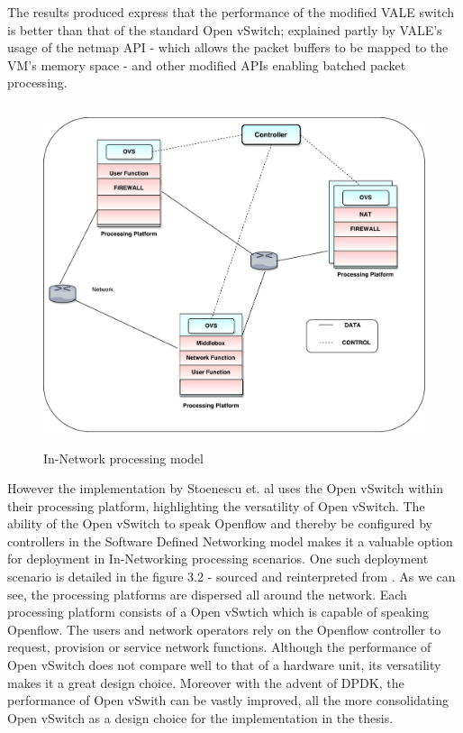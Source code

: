 The results produced express that the performance of the modified VALE switch is better than that of the standard Open vSwitch; explained partly by VALE's usage of the netmap API - which allows the packet buffers to be mapped to the VM's memory space - and other modified APIs enabling batched packet processing.

 \begin{figure}[H]
	\centering
	\caption{In-Network processing model}	
	\includegraphics[height=10cm]{innet01.pdf}	
\end{figure}

However the implementation by Stoenescu et. al \cite{NpForMasses} uses the Open vSwitch within their processing platform, highlighting the versatility of Open vSwitch. The ability of the Open vSwitch to speak Openflow and thereby be configured by controllers in the Software Defined Networking model makes it a valuable option for deployment in In-Networking processing scenarios. One such deployment scenario is detailed in the figure 3.2 - sourced and reinterpreted from \cite{NpForMasses}. As we can see, the processing platforms are dispersed all around the network. Each processing platform consists of a Open vSwtich which is capable of speaking Openflow. The users and network operators rely on the Openflow controller to request, provision or service network functions. Although the performance of Open vSwitch does not compare well to that of a hardware unit, its versatility makes it a great design choice. Moreover with the advent of DPDK, the performance of Open vSwith can be vastly improved, all the more consolidating Open vSwitch as a design choice for the implementation in the thesis.

